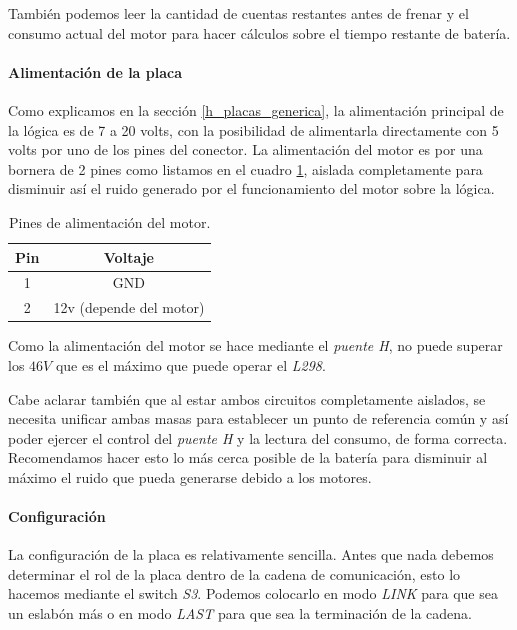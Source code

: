 Tambi\'en podemos leer la cantidad de cuentas restantes antes de frenar y el consumo actual del motor para
hacer c\'alculos sobre el tiempo restante de bater\'ia.

\paragraph{Alimentaci\'on de la placa}
\label{h_placas_motorDC_alimentacion}

Como explicamos en la secci\'on \ref{h_placas_generica}, la alimentaci\'on principal de la l\'ogica es
de 7 a 20 volts, con la posibilidad de alimentarla directamente con 5 volts por uno de los pines del conector.
La alimentaci\'on del motor es por una bornera de 2 pines como listamos en el cuadro \ref{hT_placa_dc_alimentacion},
aislada completamente para disminuir as\'i el ruido generado por el funcionamiento del motor sobre la l\'ogica.

\begin{table}
	\begin{center}
		\begin{tabular}{|c|c|}
			\hline
			Pin & Voltaje \\
			\hline
			1 & GND \\
			\hline
			2 & 12v (depende del motor) \\
			\hline
		\end{tabular}
		\caption{Pines de alimentaci\'on del motor.}
		\label{hT_placa_dc_alimentacion}
	\end{center}
\end{table}

Como la alimentaci\'on del motor se hace mediante el \emph{puente H}, no puede superar los $46V$ que es el
m\'aximo que puede operar el \emph{L298}.

Cabe aclarar tambi\'en que al estar ambos circuitos completamente aislados, se necesita unificar ambas masas
para establecer un punto de referencia com\'un y as\'i poder ejercer el control del \emph{puente H} y la lectura
del consumo, de forma correcta.
Recomendamos hacer esto lo m\'as cerca posible de la bater\'ia para disminuir al m\'aximo el ruido que pueda
generarse debido a los motores.

\paragraph{Configuraci\'on}
\label{h_placas_motorDC_config}

La configuraci\'on de la placa es relativamente sencilla.
Antes que nada debemos determinar el rol de la placa dentro de la cadena de comunicaci\'on, esto lo hacemos
mediante el switch \emph{S3}.
Podemos colocarlo en modo \emph{LINK} para que sea un eslab\'on m\'as o en modo \emph{LAST} para que sea
la terminaci\'on de la cadena.

